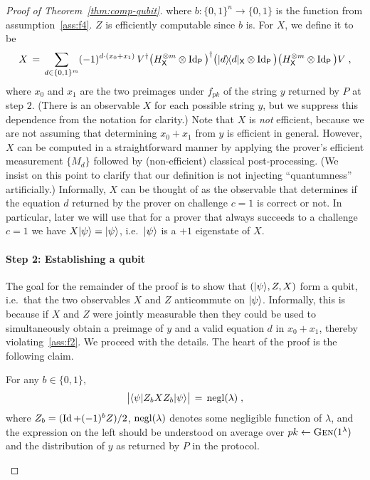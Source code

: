 \begin{proof}[Proof of Theorem~\ref{thm:comp-qubit}]
where $b:\{0,1\}^n\to\{0,1\}$ is the function from assumption~\ref{ass:f4}. 
$Z$ is efficiently computable since $b$ is. For $X$, we define it to be 
\begin{equation}\label{eq:comp-qubit-proof-1b}
 X\,=\, \sum_{d\in\{0,1\}^m} (-1)^{d\cdot(x_0+x_1)}\,  V^\dagger \big(H^{\otimes m}_{\textsf{X}}\otimes \mathop{\rm Id}\nolimits_{\textsf{P}}\big)^\dagger \big(|d\rangle\!\langle d|_{\textsf{X}} \otimes \mathop{\rm Id}\nolimits_{\textsf{P}} \big)\big(H^{\otimes m}_{\textsf{X}}\otimes \mathop{\rm Id}\nolimits_{\textsf{P}}\big) V\;,
\end{equation}
where $x_0$ and $x_1$ are the two preimages under $f_{pk}$ of the string $y$ returned by $P$ at step $2$. (There is an observable $X$ for each possible string $y$, but we suppress this dependence from the notation for clarity.) Note that $X$ is \emph{not} efficient, because we are not assuming that determining $x_0+x_1$ from $y$ is efficient in general. However, $X$ can be computed in a straightforward manner by applying the prover's efficient measurement $\{M_d\}$ followed by (non-efficient) classical post-processing. (We insist on this point to clarify that our definition is not injecting ``quantumness'' artificially.) Informally, $X$ can be thought of as the observable that determines if the equation $d$ returned by the prover on challenge $c=1$ is correct or not. In particular, later we will use that for a prover that always succeeds to a challenge $c=1$ we have $X|\psi\rangle = |\psi\rangle$, i.e.\ $|\psi\rangle$ is a $+1$ eigenstate of $X$. 

\paragraph{Step 2: Establishing a qubit} The goal for the remainder of the proof is to show that $(|\psi\rangle,Z,X)$ form a qubit, i.e.\ that the two observables $X$ and $Z$ anticommute on $|\psi\rangle$. Informally, this is because if $X$ and $Z$ were jointly measurable then they could be used to simultaneously obtain a preimage of $y$ and a valid equation $d$ in $x_0+ x_1$, thereby violating~\ref{ass:f2}. We proceed with the details.  
The heart of the proof is the following claim. 

\begin{claim}\label{claim:comp-qubit-1}
For any $b\in \{0,1\}$, 
\[\big| \langle\psi| Z_b X Z_b |\psi\rangle \big| \,=\, \operatorname{negl}(\lambda) \;,\]
where $Z_b = (\mathop{\rm Id}\nolimits + (-1)^b Z)/2$, $\operatorname{negl}(\lambda)$ denotes some negligible function of $\lambda$, and the expression on the left should be understood on average over $pk\leftarrow \textsc{Gen}(1^\lambda)$ and the distribution of $y$ as returned by $P$ in the protocol. 
\end{claim}


\end{proof}
